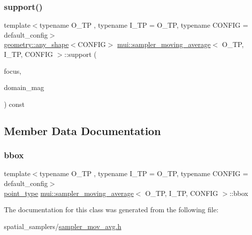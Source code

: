 \mbox{\label{classmui_1_1sampler__moving__average_ab9c5dc123972f1054a2811895419eff0}} 
\subsubsection{\texorpdfstring{support()}{support()}}
{\footnotesize\ttfamily template$<$typename O\+\_\+\+TP , typename I\+\_\+\+TP  = O\+\_\+\+TP, typename C\+O\+N\+F\+IG  = default\+\_\+config$>$ \\
\hyperlink{classmui_1_1geometry_1_1any__shape}{geometry\+::any\+\_\+shape}$<$C\+O\+N\+F\+IG$>$ \hyperlink{classmui_1_1sampler__moving__average}{mui\+::sampler\+\_\+moving\+\_\+average}$<$ O\+\_\+\+TP, I\+\_\+\+TP, C\+O\+N\+F\+IG $>$\+::support (\begin{DoxyParamCaption}\item[{\hyperlink{classmui_1_1sampler__moving__average_ae687f5cbf78af76e22bf97845f386300}{point\+\_\+type}}]{focus,  }\item[{\hyperlink{classmui_1_1sampler__moving__average_ace3d3dadc4a7ed5724076533634e6c41}{R\+E\+AL}}]{domain\+\_\+mag }\end{DoxyParamCaption}) const\hspace{0.3cm}{\ttfamily [inline]}}



\subsection{Member Data Documentation}
\mbox{\label{classmui_1_1sampler__moving__average_a64a46fb3b030c557f1dd50b9f059c427}} 
\subsubsection{\texorpdfstring{bbox}{bbox}}
{\footnotesize\ttfamily template$<$typename O\+\_\+\+TP , typename I\+\_\+\+TP  = O\+\_\+\+TP, typename C\+O\+N\+F\+IG  = default\+\_\+config$>$ \\
\hyperlink{classmui_1_1sampler__moving__average_ae687f5cbf78af76e22bf97845f386300}{point\+\_\+type} \hyperlink{classmui_1_1sampler__moving__average}{mui\+::sampler\+\_\+moving\+\_\+average}$<$ O\+\_\+\+TP, I\+\_\+\+TP, C\+O\+N\+F\+IG $>$\+::bbox\hspace{0.3cm}{\ttfamily [protected]}}



The documentation for this class was generated from the following file\+:\begin{DoxyCompactItemize}
\item 
spatial\+\_\+samplers/\hyperlink{sampler__mov__avg_8h}{sampler\+\_\+mov\+\_\+avg.\+h}\end{DoxyCompactItemize}
